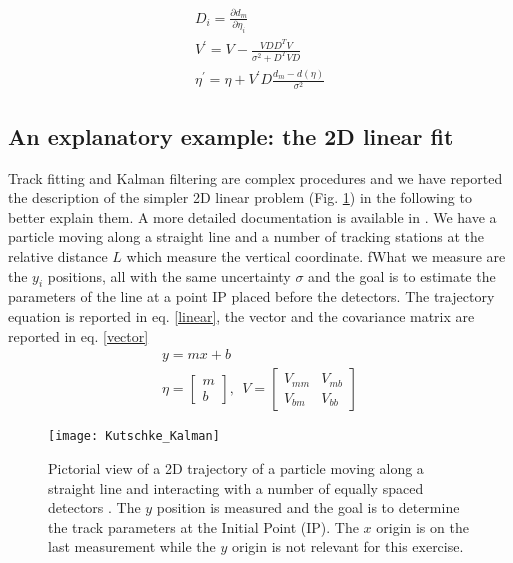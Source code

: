 \documentclass[12pt,a4paper,openright, oneside, titlepage]{book} %
\begin{document}
\begin{equation}
\begin{gathered}
D_i = \frac{\partial d_m}{\partial \eta_i} \\
V^\prime = V - \frac{VDD^TV}{\sigma^2+D^TVD}\\
\eta^\prime = \eta + V^\prime D \frac{d_m-d(\eta)}{\sigma^2}
\end{gathered} 
\label{eq_Kalman}
\end{equation}

\subsection{An explanatory example: the 2D linear fit}
\label{2Dfit}
Track fitting and Kalman filtering are complex procedures 
and we have reported the description of the simpler 2D linear problem (Fig. \ref{_Kutschke_Kalman})
in the following to better explain them. A more detailed documentation is available in 
 \cite{Kutschke} \cite{KutschkePaper}. 
We have a particle moving along a straight line and a number of tracking stations at the relative
distance $L$ which measure the vertical coordinate.
fWhat we measure are the $y_i$ positions, 
all with the same uncertainty $\sigma$ and the goal is to estimate the parameters of the line at a point IP
placed before the detectors.
The trajectory equation is reported in eq. \ref{linear}, 
the vector and the covariance matrix are reported in eq. \ref{vector}
\begin{gather}
y = mx +b \label{linear}\\
\eta = \begin{bmatrix} m \\  b \end{bmatrix},\ \ V=\begin{bmatrix} V_{mm}& V_{mb} \\ V_{bm}& V_{bb} \end{bmatrix} \label{vector}
\end{gather}  

\begin{figure}[h!]
\centering
\texttt{[image: Kutschke\_Kalman]}
\caption{Pictorial view of a 2D trajectory of a particle moving along a straight line 
and interacting with a number of equally spaced detectors \cite{Kutschke}. 
The $y$ position is measured and the goal is to determine the track parameters 
at the Initial Point (IP). 
The $x$ origin is on the last measurement while the $y$ origin is not relevant for this exercise.}
\label{_Kutschke_Kalman}
\end{figure}
\end{document}
